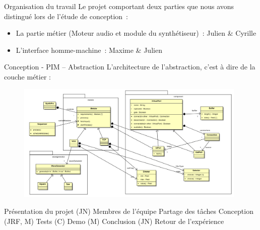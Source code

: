 \documentclass[frenchb]{beamer}
\begin{document}
\begin{frame}{Organisation du travail}
Le projet comportant deux parties que nous avons distingué lors de l'étude de conception~:
\begin{itemize}
    \item La partie métier (Moteur audio et module du synthétiseur)~: Julien \& Cyrille
    \item L'interface homme-machine~: Maxime \& Julien   
\end{itemize}
\end{frame}

\begin{frame}{Conception - PIM -- Abstraction}
L'architecture de l'abstraction, c'est à dire de la couche métier :
    \begin{figure}
        \includegraphics[width=11cm ]{../img/ps/pim-abstraction.pdf}
    \end{figure}


\end{frame}
Présentation du projet (JN)
Membres de l'équipe
Partage des tâches
Conception (JRF, M)
Tests (C)
Demo (M)
Conclusion (JN)
Retour de l'expérience
\end{document}
